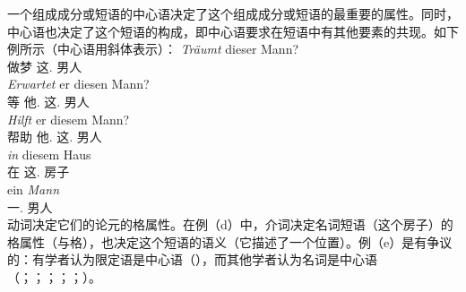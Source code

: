 一个组成成分或短语的中心语决定了这个组成成分或短语的最重要的属性。同时，中心语也决定了这个短语的构成，即中心语要求在短语中有其他要素的共现。如下例所示（中心语用斜体表示）：
\eal
\ex 
\gll \emph{Träumt} dieser Mann?\\
     做梦 这.\nom{} 男人\\
\ex 
\gll \emph{Erwartet} er diesen Mann?\\
	 等 他.\nom{} 这.\acc{} 男人\\
\ex 
\gll \emph{Hilft} er diesem Mann?\\
	 帮助 他.\nom{} 这.\dat{} 男人\\
\ex 
\gll \emph{in} diesem Haus\\
	 在 这.\dat{} 房子\\
\ex 
\gll ein \emph{Mann}\\
	 一.\nom{} 男人\\
\zl
动词决定它们的论元的格属性。在例（d）中，介词决定名词短语（这个房子）的格属性（与格），也决定这个短语的语义（它描述了一个位置）。例（e）是有争议的：有学者认为限定语是中心语（\citealp{VH77a-u,Hellan86a,Abney87a,Netter94,Netter98a}），而其他学者认为名词是中心语（\citealp{vanLangendonck94a}；\citealp[]{ps2}；\citealp{Demske2001a}；\citealp[\S~6.6.1]{MuellerLehrbuch1}；\citealp{Hudson2004a}；\citealp{Bruening2009a}）。


